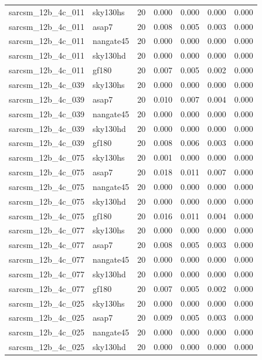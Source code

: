 \begin{tabular}{llrrrrr}
sarcsm\_12b\_4c\_011 & sky130hs & 20 & 0.000 & 0.000 & 0.000 & 0.000 \\
sarcsm\_12b\_4c\_011 & asap7 & 20 & 0.008 & 0.005 & 0.003 & 0.000 \\
sarcsm\_12b\_4c\_011 & nangate45 & 20 & 0.000 & 0.000 & 0.000 & 0.000 \\
sarcsm\_12b\_4c\_011 & sky130hd & 20 & 0.000 & 0.000 & 0.000 & 0.000 \\
sarcsm\_12b\_4c\_011 & gf180 & 20 & 0.007 & 0.005 & 0.002 & 0.000 \\
sarcsm\_12b\_4c\_039 & sky130hs & 20 & 0.000 & 0.000 & 0.000 & 0.000 \\
sarcsm\_12b\_4c\_039 & asap7 & 20 & 0.010 & 0.007 & 0.004 & 0.000 \\
sarcsm\_12b\_4c\_039 & nangate45 & 20 & 0.000 & 0.000 & 0.000 & 0.000 \\
sarcsm\_12b\_4c\_039 & sky130hd & 20 & 0.000 & 0.000 & 0.000 & 0.000 \\
sarcsm\_12b\_4c\_039 & gf180 & 20 & 0.008 & 0.006 & 0.003 & 0.000 \\
sarcsm\_12b\_4c\_075 & sky130hs & 20 & 0.001 & 0.000 & 0.000 & 0.000 \\
sarcsm\_12b\_4c\_075 & asap7 & 20 & 0.018 & 0.011 & 0.007 & 0.000 \\
sarcsm\_12b\_4c\_075 & nangate45 & 20 & 0.000 & 0.000 & 0.000 & 0.000 \\
sarcsm\_12b\_4c\_075 & sky130hd & 20 & 0.000 & 0.000 & 0.000 & 0.000 \\
sarcsm\_12b\_4c\_075 & gf180 & 20 & 0.016 & 0.011 & 0.004 & 0.000 \\
sarcsm\_12b\_4c\_077 & sky130hs & 20 & 0.000 & 0.000 & 0.000 & 0.000 \\
sarcsm\_12b\_4c\_077 & asap7 & 20 & 0.008 & 0.005 & 0.003 & 0.000 \\
sarcsm\_12b\_4c\_077 & nangate45 & 20 & 0.000 & 0.000 & 0.000 & 0.000 \\
sarcsm\_12b\_4c\_077 & sky130hd & 20 & 0.000 & 0.000 & 0.000 & 0.000 \\
sarcsm\_12b\_4c\_077 & gf180 & 20 & 0.007 & 0.005 & 0.002 & 0.000 \\
sarcsm\_12b\_4c\_025 & sky130hs & 20 & 0.000 & 0.000 & 0.000 & 0.000 \\
sarcsm\_12b\_4c\_025 & asap7 & 20 & 0.009 & 0.005 & 0.003 & 0.000 \\
sarcsm\_12b\_4c\_025 & nangate45 & 20 & 0.000 & 0.000 & 0.000 & 0.000 \\
sarcsm\_12b\_4c\_025 & sky130hd & 20 & 0.000 & 0.000 & 0.000 & 0.000 \\

\end{tabular}

